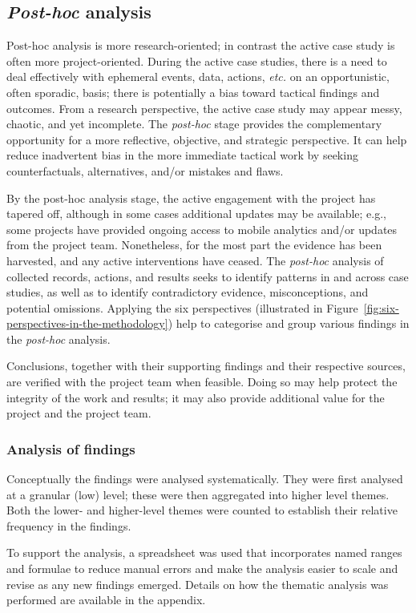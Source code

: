 \subsection{\emph{Post-hoc} analysis}
Post-hoc analysis is more research-oriented; in contrast the active case study is often more project-oriented. During the active case studies, there is a need to deal effectively with ephemeral events, data, actions, \textit{etc.} on an opportunistic, often sporadic, basis; there is potentially a bias toward tactical findings and outcomes. From a research perspective, the active case study may appear messy, chaotic, and yet incomplete. The \textit{post-hoc} stage provides the complementary opportunity for a more reflective, objective, and strategic perspective. It can help reduce inadvertent bias in the more immediate tactical work by seeking counterfactuals, alternatives, and/or mistakes and flaws.

By the post-hoc analysis stage, the active engagement with the project has tapered off, although in some cases additional updates may be available; e.g., some projects have provided ongoing access to mobile analytics and/or updates from the project team. Nonetheless, for the most part the evidence has been harvested, and any active interventions have ceased. The  \emph{post-hoc} analysis of collected records, actions, and results seeks to identify patterns in and across case studies, as well as to identify contradictory evidence,  misconceptions, and potential omissions.  Applying the six perspectives (illustrated in Figure~\ref{fig:six-perspectives-in-the-methodology}) help to categorise and group various findings in the \textit{post-hoc} analysis. 

Conclusions, together with their supporting findings and their respective sources, are verified with the project team when feasible. Doing so may help protect the integrity of the work and results; it may also provide additional value for the project and the project team. 

\subsubsection{Analysis of findings}
Conceptually the findings were analysed systematically. They were first analysed at a granular (low) level; these were then aggregated into higher level themes. Both the lower- and higher-level themes were counted to establish their relative frequency in the findings. 

To support the analysis, a spreadsheet was used that incorporates named ranges and formulae to reduce manual errors and make the analysis easier to scale and revise as any new findings emerged. Details on how the thematic analysis was performed are available in the \href{appendix-thematic-analysis}{} appendix.

